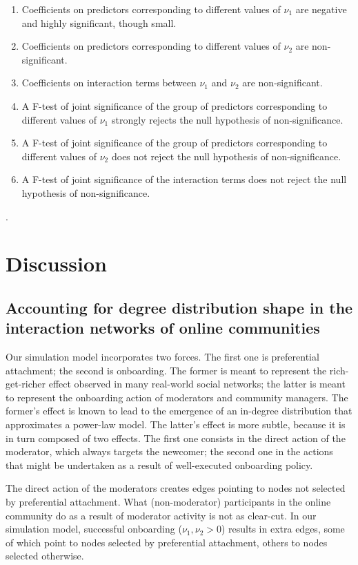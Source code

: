 \documentclass{article}
\begin{document}
\begin{enumerate}
\item Coefficients on predictors corresponding to different values of $\nu_1$ are negative and highly significant, though small.
\item Coefficients on predictors corresponding to different values of $\nu_2$ are non-significant.
\item Coefficients on interaction terms between $\nu_1$ and $\nu_2$ are non-significant.
\item A F-test of joint significance of the group of predictors corresponding to different values of $\nu_1$ strongly rejects the null hypothesis of non-significance. 
\item A F-test of joint significance of the group of predictors corresponding to different values of $\nu_2$ does not reject the null hypothesis of non-significance.
\item A F-test of joint significance of the interaction terms does not reject the null hypothesis of non-significance.
\end{enumerate}.

\section{Discussion}

\subsection{Accounting for degree distribution shape in the interaction networks of online communities}

Our simulation model incorporates two forces. The first one is preferential attachment; the second is onboarding. The former is meant to represent the rich-get-richer effect observed in many real-world social networks; the latter is meant to represent the onboarding action of moderators and community managers. The former's effect is known to lead to the emergence of an in-degree distribution that approximates a power-law model. The latter's effect is more subtle, because it is in turn composed of two effects. The first one consists in the direct action of the moderator, which  always targets the newcomer; the second one in the actions that might be undertaken as a result of well-executed onboarding policy. 

The direct action of the moderators creates edges pointing to nodes not selected by preferential attachment. What (non-moderator) participants in the online community do as a result of moderator activity is not as clear-cut. In our simulation model, successful onboarding ($\nu_1, \nu_2 > 0$) results in extra edges, some of which point to nodes selected by preferential attachment, others to nodes selected otherwise. 
\end{document}
